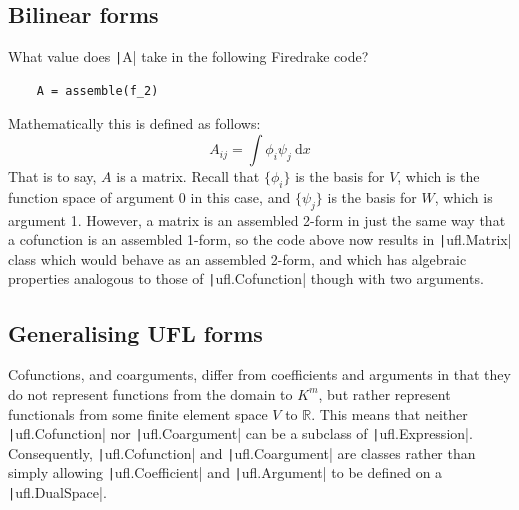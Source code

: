 \documentclass[a4paper,11pt]{article}
\begin{document}
\subsection{Bilinear forms}

What value does \texttt|A| take in the following Firedrake code?
\begin{verbatim}
    A = assemble(f_2)
\end{verbatim}
Mathematically this is defined as follows:
\begin{equation}
    A_{ij} = \int \phi_i \psi_j\ \mathrm{d}x
\end{equation}
That is to say, $A$ is a matrix. Recall that $\{\phi_i\}$ is the basis for $V$, which is the function space of argument 0 in this case, and $\{\psi_j\}$ is the basis for $W$, which is argument 1. However, a matrix is an assembled 2-form in just the same way that a cofunction is an assembled 1-form, so the code above now results in \texttt|ufl.Matrix| class which would behave as an assembled 2-form, and which has algebraic properties analogous to those of \texttt|ufl.Cofunction| though with two arguments.

\subsection{Generalising UFL forms}

Cofunctions, and coarguments, differ from coefficients and arguments in that they do not represent functions from the domain to $K^m$, but rather represent functionals from some finite element space $V$ to $\mathbb{R}$. This means that neither \texttt|ufl.Cofunction| nor \texttt|ufl.Coargument| can be a subclass of \texttt|ufl.Expression|. 
Consequently, \texttt|ufl.Cofunction| and \texttt|ufl.Coargument| are classes rather than simply allowing \texttt|ufl.Coefficient| and \texttt|ufl.Argument| to be defined on a \texttt|ufl.DualSpace|.
\end{document}
